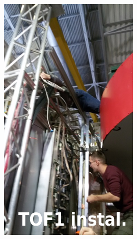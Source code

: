\documentclass[dvipsnames] {beamer}
\begin{document}
\begin{frame}
\begin{columns}[t]
\begin{minipage}{.49\linewidth}
    \end{minipage}
    \begin{minipage}{.49\linewidth}
      \includegraphics[width=1.\linewidth]{TOF400_installation.png}
    \end{minipage}


\end{columns}
\end{frame}
\end{document}
